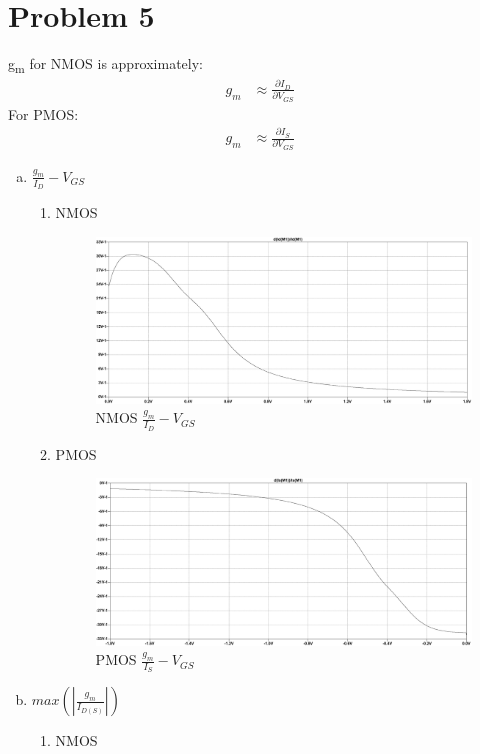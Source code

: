 \documentclass{article}
\begin{document}
\section{Problem 5}
\label{sec:org721eaad}
g\textsubscript{m} for NMOS is approximately:
\begin{equation*}
\begin{align}
g_{m} &\approx \frac{\partial{I_{D}}}{\partial{V_{GS}}}
\end{align}
\end{equation*}
For PMOS:
\begin{equation*}
\begin{align}
g_{m} &\approx \frac{\partial{I_{S}}}{\partial{V_{GS}}}
\end{align}
\end{equation*}
\begin{enumerate}[(a)]
\item \(\frac{g_{m}}{I_{D}}-V_{GS}\)
\begin{enumerate}[1.]
\item NMOS
\begin{figure}[H]
\centering
\includegraphics[width=.9\linewidth]{img/q5/a/nmos-d-id-id-vgs.pdf}
\caption{\label{fig:nmos-d-id-id-vgs}NMOS \(\frac{g_{m}}{I_{D}}-V_{GS}\)}
\end{figure}
\item PMOS
\begin{figure}[H]
\centering
\includegraphics[width=.9\linewidth]{img/q5/a/pmos-d-is-is-vgs.pdf}
\caption{\label{fig:pmos-d-is-is-vgs}PMOS \(\frac{g_{m}}{I_{S}}-V_{GS}\)}
\end{figure}
\end{enumerate}
\item \(max(|\frac{g_{m}}{I_{D(S)}}|)\)
\begin{enumerate}[1.]
\item NMOS


\end{enumerate}
\end{enumerate}
\end{document}
